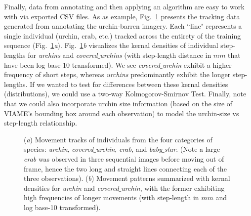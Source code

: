 \documentclass[11pt]{article}
\begin{document}
Finally, data from annotating and then applying an algorithm are easy 
to work with via exported CSV files.  
As as example, Fig.~\ref{movement} presents the tracking data generated 
from annotating the urchin-barren imagery. 
Each ``line" represents a single individual (urchin, crab, etc.) 
tracked across the entirety of the training sequence
(Fig.~\ref{movement}\textit{a}). 
Fig.~\ref{movement}\textit{b} visualizes the kernal densities of 
individual step-lengths for \textit{urchins} and 
\textit{covered$\_$urchins} (with step-length distance in $mm$ that 
have been log base-10 transformed).
We see \textit{covered$\_$urchin} exhibit a higher frequency of short 
steps, whereas \textit{urchins} predominantly exhibit the longer 
step-lengths. 
If we wanted to test for differences between these kernal densities 
(distributions), we could use a two-way Kolmogorov-Smirnov Test. 
Finally, note that we could also incorporate urchin size information 
(based on the size of VIAME's bounding box around each observation) to 
model the urchin-size vs step-length relationship. 

\begin{figure}[!]
\centering
{}
\caption{
(\textit{a}) Movement tracks of individuals from the four categories of 
species: \textit{urchin}, \textit{covered$\_$urchin}, 
\textit{crab}, and \textit{baby$\_$star}. 
(Note a large \textit{crab} was observed in three sequential images 
before moving out of frame, hence the two long and 
straight lines connecting each of the three observations). 
(\textit{b}) Movement patterns summarized with kernal densities for 
\textit{urchin} and \textit{covered$\_$urchin}, with the former 
exhibiting high frequencies of longer movements (with step-length in 
$mm$ and log base-10 transformed).
}
\label{movement}
\end{figure}
\end{document}
